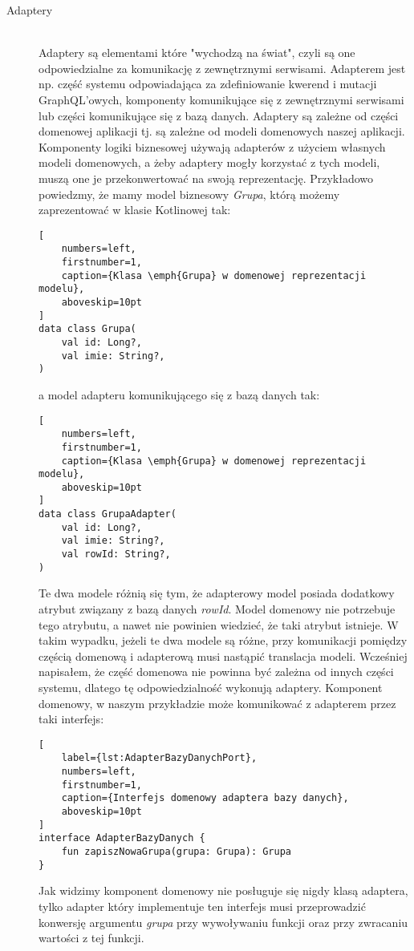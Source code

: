 \begin{description}
\item[Adaptery] \hfill \\ Adaptery są elementami które "wychodzą na świat", czyli są one odpowiedzialne za komunikację z zewnętrznymi serwisami. Adapterem jest np. część systemu odpowiadająca za zdefiniowanie kwerend i mutacji GraphQL'owych, komponenty komunikujące się z zewnętrznymi serwisami lub części komunikujące się z bazą danych. Adaptery są zależne od części domenowej aplikacji tj. są zależne od modeli domenowych naszej aplikacji. Komponenty logiki biznesowej używają adapterów z użyciem własnych modeli domenowych, a żeby adaptery mogły korzystać z tych modeli, muszą one je przekonwertować na swoją reprezentację. Przykładowo powiedzmy, że mamy model biznesowy \emph{Grupa}, którą możemy zaprezentować w klasie Kotlinowej tak:


\begin{addmargin}[6mm]{0mm}
\begin{lstlisting}[
    numbers=left,
    firstnumber=1,
    caption={Klasa \emph{Grupa} w domenowej reprezentacji modelu},
    aboveskip=10pt
]
data class Grupa(
    val id: Long?,
    val imie: String?,
)
\end{lstlisting}
\end{addmargin}

a model adapteru komunikującego się z bazą danych tak:
\begin{addmargin}[6mm]{0mm}
\begin{lstlisting}[
    numbers=left,
    firstnumber=1,
    caption={Klasa \emph{Grupa} w domenowej reprezentacji modelu},
    aboveskip=10pt
]
data class GrupaAdapter(
    val id: Long?,
    val imie: String?,
    val rowId: String?,
)
\end{lstlisting}
\end{addmargin}
Te dwa modele różnią się tym, że adapterowy model posiada dodatkowy atrybut związany z bazą danych \emph{rowId}. Model domenowy nie potrzebuje tego atrybutu, a nawet nie powinien wiedzieć, że taki atrybut istnieje. W takim wypadku, jeżeli te dwa modele są różne, przy komunikacji pomiędzy częścią domenową i adapterową musi nastąpić translacja modeli. Wcześniej napisałem, że część domenowa nie powinna być zależna od innych części systemu, dlatego tę odpowiedzialność wykonują adaptery. Komponent domenowy, w naszym przykładzie może komunikować z adapterem przez taki interfejs:
\begin{addmargin}[6mm]{0mm}
\begin{lstlisting}[
    label={lst:AdapterBazyDanychPort},
    numbers=left,
    firstnumber=1,
    caption={Interfejs domenowy adaptera bazy danych},
    aboveskip=10pt
]
interface AdapterBazyDanych {
    fun zapiszNowaGrupa(grupa: Grupa): Grupa
}
\end{lstlisting}
\end{addmargin}
Jak widzimy komponent domenowy nie posługuje się nigdy klasą adaptera, tylko adapter który implementuje ten interfejs musi przeprowadzić konwersję argumentu \emph{grupa} przy wywoływaniu funkcji oraz przy zwracaniu wartości z tej funkcji.


\end{description}
